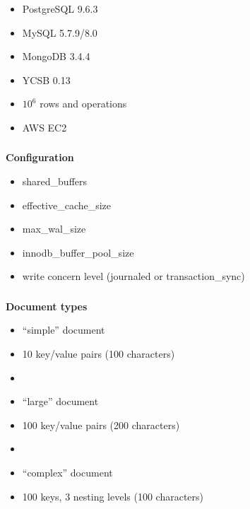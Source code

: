 \documentclass[usenames,dvipsnames, 18pt, compress, aspectratio=169]{beamer}
\begin{document}
\begin{frame}
    \frametitle{}
    \begin{center}
        \begin{itemize}[label={}]
            \item PostgreSQL 9.6.3
            \item MySQL 5.7.9/8.0
            \item MongoDB 3.4.4
            \item YCSB 0.13
            \item $10^6$ rows and operations
            \item AWS EC2
        \end{itemize}
    \end{center}
\end{frame}

\begin{frame}
    \frametitle{}
    \begin{center}
        \textbf{Configuration}
        \begin{itemize}[label={}]
            \item shared\_buffers
            \item effective\_cache\_size
            \item max\_wal\_size
            \item innodb\_buffer\_pool\_size
            \item write concern level (journaled or transaction\_sync)
        \end{itemize}
    \end{center}
\end{frame}

\begin{frame}
    \frametitle{}
    \begin{center}
        \textbf{Document types}
        \begin{itemize}[label={}]
            \item “simple” document
            \item 10 key/value pairs (100 characters)
            \item
            \item “large” document
            \item 100 key/value pairs (200 characters)
            \item
            \item “complex” document
            \item 100 keys, 3 nesting levels (100 characters)
        \end{itemize}
    \end{center}
\end{frame}
\end{document}
